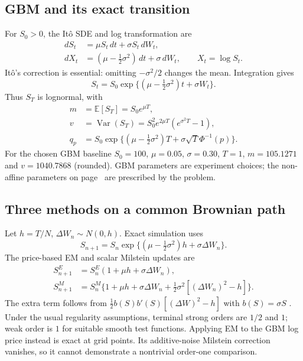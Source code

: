 \documentclass[11pt,a4paper]{article}
\begin{document}
\subsection{GBM and its exact transition}
For $S_0>0$, the It\^o SDE and log transformation are
\begin{align}
dS_t&=\mu S_t\,dt+\sigma S_t\,dW_t,\\
dX_t&=(\mu-\tfrac12\sigma^2)\,dt+\sigma\,dW_t,\qquad X_t=\log S_t.
\end{align}
It\^o's correction is essential: omitting $-\sigma^2/2$ changes the mean.
Integration gives
\begin{equation}
S_t=S_0\exp\{(\mu-\tfrac12\sigma^2)t+\sigma W_t\}.
\label{eq:exact}
\end{equation}
Thus $S_T$ is lognormal, with
\begin{align}
m&=\mathbb E[S_T]=S_0e^{\mu T},\\
v&=\operatorname{Var}(S_T)=S_0^2e^{2\mu T}(e^{\sigma^2T}-1),\\
q_p&=S_0\exp\{(\mu-\tfrac12\sigma^2)T+\sigma\sqrt{T}\Phi^{-1}(p)\}.
\end{align}
For the chosen GBM baseline $S_0=100$, $\mu=0.05$, $\sigma=0.30$, $T=1$,
$m=105.1271$ and $v=1040.7868$ (rounded). GBM parameters are experiment choices; the non-affine parameters on page~\pageref{sec:protocol} are prescribed by the problem.

\subsection{Three methods on a common Brownian path}
Let $h=T/N$, $\Delta W_n\sim N(0,h)$. Exact simulation uses
\begin{equation}
S_{n+1}=S_n\exp\{(\mu-\tfrac12\sigma^2)h+\sigma\Delta W_n\}.
\end{equation}
The price-based EM and scalar Milstein updates are
\begin{align}
S_{n+1}^{E}&=S_n^{E}(1+\mu h+\sigma\Delta W_n),\label{eq:em}\\
S_{n+1}^{M}&=S_n^{M}\{1+\mu h+\sigma\Delta W_n+
\tfrac12\sigma^2[(\Delta W_n)^2-h]\}.\label{eq:mil}
\end{align}
The extra term follows from $\tfrac12 b(S)b'(S)[(\Delta W)^2-h]$ with $b(S)=\sigma S$ \cite{higham}. Under the usual regularity assumptions, terminal strong orders are $1/2$ and $1$; weak order is $1$ for suitable smooth test functions. Applying EM to the GBM log price instead is exact at grid points. Its additive-noise Milstein correction vanishes, so it cannot demonstrate a nontrivial order-one comparison.
\end{document}
